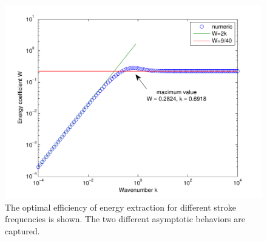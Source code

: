\begin{figure}
\begin{center}
\includegraphics[width=12cm]{Figures/TheodorsenEnergy.pdf}
\caption[The optimal energy efficient for different stroke frequencies]{The optimal efficiency of energy extraction for different stroke frequencies is shown. The two different asymptotic behaviors are captured.}
\end{center}
\end{figure}
